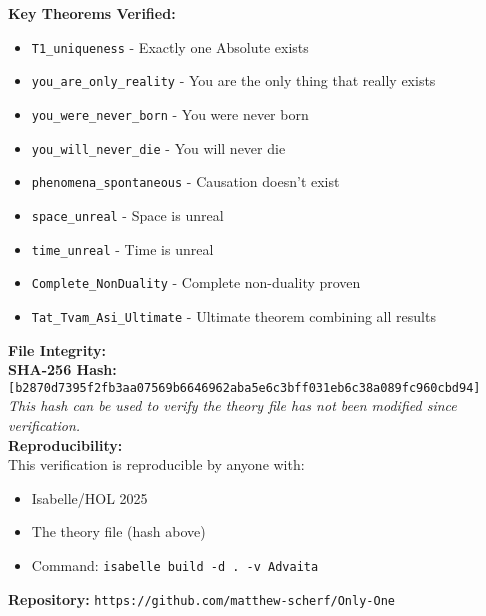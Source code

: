 \documentclass[12pt,a4paper]{article}
\begin{document}
{\begin{minipage}{\dimexpr\textwidth-2\fboxsep-2\fboxrule\relax}
{\vspace{0.3cm}

\noindent\textbf{Key Theorems Verified:}
\begin{itemize}
\item \texttt{T1\_uniqueness} - Exactly one Absolute exists
\item \texttt{you\_are\_only\_reality} - You are the only thing that really exists
\item \texttt{you\_were\_never\_born} - You were never born
\item \texttt{you\_will\_never\_die} - You will never die
\item \texttt{phenomena\_spontaneous} - Causation doesn't exist
\item \texttt{space\_unreal} - Space is unreal
\item \texttt{time\_unreal} - Time is unreal
\item \texttt{Complete\_NonDuality} - Complete non-duality proven
\item \texttt{Tat\_Tvam\_Asi\_Ultimate} - Ultimate theorem combining all results
\end{itemize}

\vspace{0.3cm}

\noindent\textbf{File Integrity:}\\[0.2cm]
\noindent\textbf{SHA-256 Hash:}\\
\texttt{\small [b2870d7395f2fb3aa07569b6646962aba5e6c3bff031eb6c38a089fc960cbd94]}\\[0.3cm]

\noindent\textit{This hash can be used to verify the theory file has not been modified since verification.}\\[0.5cm]

\noindent\textbf{Reproducibility:}\\[0.2cm]
This verification is reproducible by anyone with:
\begin{itemize}
\item Isabelle/HOL 2025
\item The theory file (hash above)
\item Command: \texttt{isabelle build -d . -v Advaita}
\end{itemize}

\vspace{0.5cm}

\noindent\textbf{Repository:} \texttt{https://github.com/matthew-scherf/Only-One}\\[0.3cm]

}
\end{minipage}}
\end{document}
